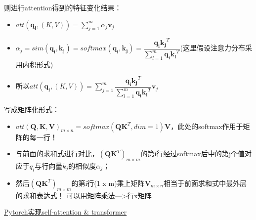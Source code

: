 \documentclass[UTF8]{article}
\begin{document}
    则进行attention得到的特征变化结果：
    \begin{itemize}
        \item $att(\boldsymbol{q_{i}},(K,V))=\sum_{j=1}^{m}\alpha_{j}\boldsymbol{v}_{j}$
        \item $\alpha_{j}=sim(\boldsymbol{q_{i},k_{j}})=softmax(\boldsymbol{q_{i},k_{j}})=\dfrac{\boldsymbol{q_{i}k_{j}}^T}{\sum_{l=1}^{m}\boldsymbol{q_{i}k_{l}}^T}$(这里假设注意力分布采用内积形式)
        \item 所以$att(\boldsymbol{q_{i}},(K,V))=\sum_{j=1}^{m}\dfrac{\boldsymbol{q_{i}k_{j}}^T}{\sum_{l=1}^{m}\boldsymbol{q_{i}k_{l}}^T}\boldsymbol{v}_{j}$
    \end{itemize}
    写成矩阵化形式：
    \begin{itemize}
        \item $att(\boldsymbol{Q,K,V})_{m\times n}=softmax(\boldsymbol{QK}^T,dim=1)\boldsymbol{V}$，此处的softmax作用于矩阵的每一行！
        \item 与前面的求和式进行对比，$(\boldsymbol{QK}^T)_{m\times m}$的第i行经过softmax后中的第j个值对应于$q_{i}$与行向量$k_{j}$的相似度$\alpha_{j}$；
        \item 然后$(\boldsymbol{QK}^T)_{m\times m}$的第i行(1 x m)乘上矩阵$\boldsymbol{V}_{m\times n}$相当于前面求和式中最外层的求和表达式！
        可以用矩阵乘法--->行x矩阵
    \end{itemize}

    \href{http://peterbloem.nl/blog/transformers}{Pytorch实现self-attention \& transformer}
\end{document}
